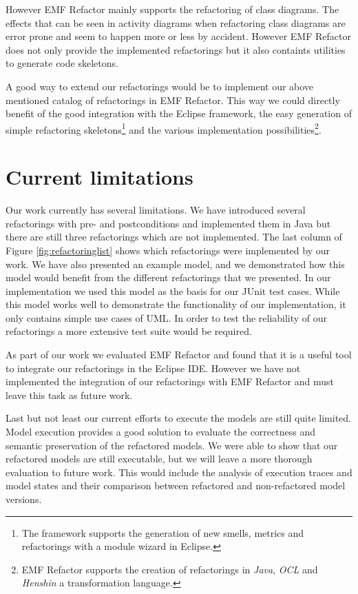 \documentclass{llncs}
\begin{document}
However EMF Refactor mainly supports the refactoring of class diagrams. The effects that can be seen in activity diagrams 
when refactoring class diagrams are error prone and seem to happen more or less by accident. However EMF Refactor does not only
provide the implemented refactorings but it also containts utilities to generate code skeletons.

A good way to extend our refactorings would be to implement our above mentioned catalog of refactorings in EMF Refactor. This way
we could directly benefit of the good integration with the Eclipse framework, the 
easy generation of simple refactoring skeletons\footnote{The framework supports the generation of new smells, metrics and 
refactorings with a module wizard in Eclipse.} and the various implementation possibilities\footnote{EMF Refactor 
supports the creation of refactorings in \textit{Java}, \textit{OCL} and \textit{Henshin} a transformation language.}. 

\section{Current limitations}
\label{sec:limitations}
Our work currently has several limitations. We have introduced several refactorings with pre- and postconditions and implemented them
in Java but there are still three refactorings which are not implemented. The last column of Figure \ref{fig:refactoringlist} shows 
which refactorings were implemented by our work. We have also presented an example model, and we demonstrated how this model 
would benefit from the different refactorings that we presented. In our implementation we used this model as the basis for our JUnit test 
cases. While this model works well to demonstrate the functionality of our implementation, it only contains simple use cases of UML. In order to test the reliability of 
our refactorings a more extensive test suite would be required.

As part of our work we evaluated EMF Refactor and found that it is a useful tool to integrate our refactorings in the Eclipse
IDE. However we have not implemented the integration of our refactorings with EMF Refactor and must leave this task as future 
work.

Last but not least our current efforts to execute the models are still quite limited. Model execution provides a good solution to 
evaluate the correctness and semantic preservation of the refactored models. We were able to show that our refactored models are still 
executable, but we will leave a more thorough evaluation to future work. This would include the analysis of execution traces and
model states and their comparison between refactored and non-refactored model versions.
\end{document}
